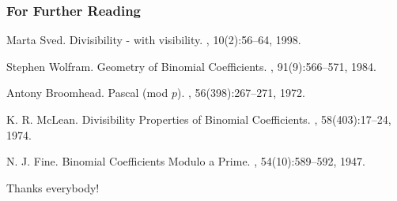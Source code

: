 \documentclass[10pt,serif, professionalfont]{beamer}
\begin{document}
\begin{frame}[allowframebreaks]
  \frametitle<presentation>{For Further Reading}
    
  \begin{thebibliography}{10}
    
  \beamertemplatebookbibitems

    
  \beamertemplatearticlebibitems

    Marta Sved.
    \newblock Divisibility - with visibility.
    , 10(2):56--64, 1998.

    Stephen Wolfram.
    \newblock Geometry of Binomial Coefficients.
    , 91(9):566--571, 1984.

    Antony Broomhead.
    \newblock Pascal (mod $p$).
    , 56(398):267--271, 1972.

    K. R. McLean.
    \newblock Divisibility Properties of Binomial Coefficients.
    , 58(403):17--24, 1974.

    N. J. Fine.
    \newblock Binomial Coefficients Modulo a Prime.
    , 54(10):589--592, 1947.
  \end{thebibliography}
\end{frame}

\begin{frame}
    \begin{center}
        \Large Thanks everybody!
    \end{center}
\end{frame}
\end{document}
